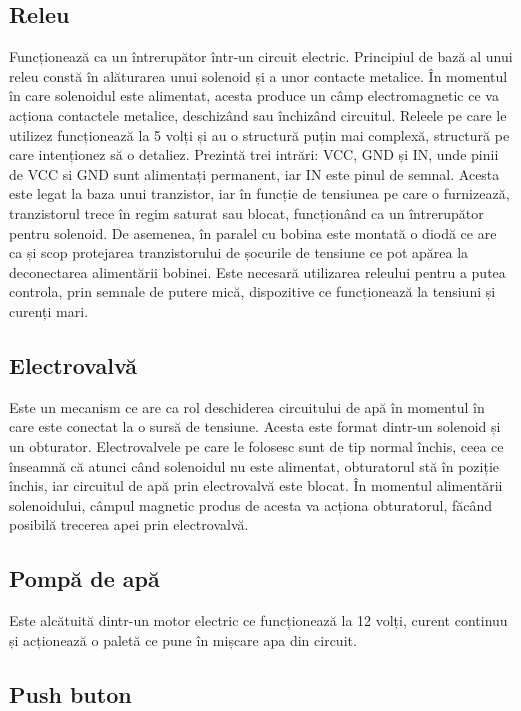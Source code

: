 \subsection{Releu}

	Funcționează ca un întrerupător într-un circuit electric. Principiul de bază al unui releu constă în alăturarea unui solenoid și a unor contacte metalice. În momentul în care solenoidul este alimentat, acesta produce un câmp electromagnetic ce va acționa contactele metalice, deschizând sau închizând circuitul. Releele pe care le utilizez funcționează la 5 volți și au o structură puțin mai complexă, structură pe care intenționez să o detaliez. Prezintă trei intrări: VCC, GND și IN, unde pinii de VCC si GND sunt alimentați permanent, iar IN este pinul de semnal. Acesta este legat la baza unui tranzistor, iar în funcție de tensiunea pe care o furnizează, tranzistorul trece în regim saturat sau blocat, funcționând ca un întrerupător pentru solenoid. De asemenea, în paralel cu bobina este montată o diodă ce are ca și scop protejarea tranzistorului de șocurile de tensiune ce pot apărea la deconectarea alimentării bobinei. Este necesară utilizarea releului pentru a putea controla, prin semnale de putere mică, dispozitive ce funcționează la tensiuni și curenți mari. 

\subsection{Electrovalvă}

	Este un mecanism ce are ca rol deschiderea circuitului de apă în momentul în care este conectat la o sursă de tensiune. Acesta este format dintr-un solenoid și un obturator. Electrovalvele pe care le folosesc sunt de tip normal închis, ceea ce înseamnă că atunci când solenoidul nu este alimentat, obturatorul stă în poziție închis, iar circuitul de apă prin electrovalvă este blocat. În momentul alimentării solenoidului, câmpul magnetic produs de acesta va acționa obturatorul, făcând posibilă trecerea apei prin electrovalvă.

\subsection{Pompă de apă}

	Este alcătuită dintr-un motor electric ce funcționează la 12 volți, curent continuu și acționează o paletă ce pune în mișcare apa din circuit.   

\subsection{Push buton}

